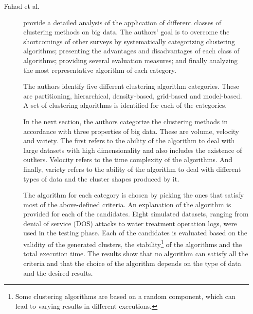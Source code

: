 \begin{description}
    \item[Fahad et al.]\cite{Fahad.Alshatri.ea_SurveyClusteringAlgorithms_2014a} provide a detailed analysis of the application of different classes of clustering methods on big data. The authors' goal is to overcome the shortcomings of other surveys by systematically categorizing clustering algorithms; presenting the advantages and disadvantages of each class of algorithms; providing several evaluation measures; and finally analyzing the most representative algorithm of each category.
    
    The authors identify five different clustering algorithm categories. These are partitioning, hierarchical, density-based, grid-based and model-based. A set of clustering algorithms is identified for each of the categories.

    In the next section, the authors categorize the clustering methods in accordance with three properties of big data. These are volume, velocity and variety. The first refers to the ability of the algorithm to deal with large datasets with high dimensionality and also includes the existence of outliers. Velocity refers to the time complexity of the algorithms. And finally, variety refers to the ability of the algorithm to deal with different types of data and the cluster shapes produced by it.

    The algorithm for each category is chosen by picking the ones that satisfy most of the above-defined criteria. An explanation of the algorithm is provided for each of the candidates. Eight simulated datasets, ranging from denial of service (DOS) attacks to water treatment operation logs, were used in the testing phase. Each of the candidates is evaluated based on the validity of the generated clusters, the stability\footnote{Some clustering algorithms are based on a random component, which can lead to varying results in different executions.} of the algorithms and the total execution time. The results show that no algorithm can satisfy all the criteria and that the choice of the algorithm depends on the type of data and the desired results.
\end{description}

